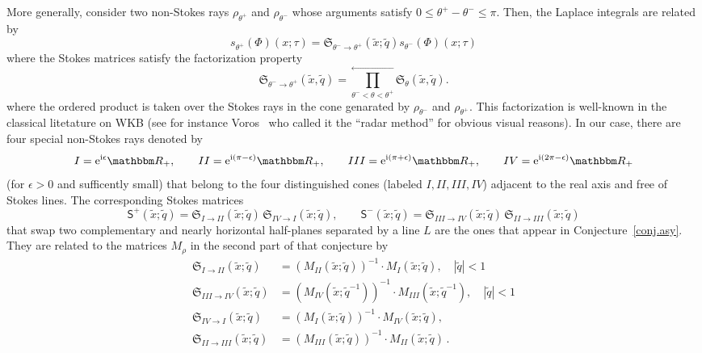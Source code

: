\documentclass[12pt,reqno]{amsart}
\theoremstyle{definition}
\def\BR{\mathbbm R}
\def\tq{\tilde{q}}
\def\tx{\tilde{x}}
\def\th{\theta}
\def\ri{\mathrm{i}}
\def\tx{\tilde{x}}
\def\re{{\rm e}}
\def\ri{{\rm i}}
\def\mf{\mathfrak}
\def\mfS{\mathfrak{S}}
\def\ms{\mathsf}
\newcommand{\nn}{\nonumber \\}
\begin{document}
More generally, consider two non-Stokes rays $\rho_{\th^+}$ and
$\rho_{\th^-}$ whose arguments satisfy $0 \leq \th^+-\th^- \leq
\pi$. Then, the Laplace integrals are related by
\begin{equation}
\label{lap3}
  s_{\theta^+}(\Phi)(x;\tau) =
  \mfS_{\theta^- \rightarrow \theta^+}(\tx;\tq) s_{\theta^-}(\Phi)(x;\tau) 
\end{equation}
where the Stokes matrices satisfy the factorization property
\begin{equation}
  \mfS_{\theta^- \rightarrow \theta^+ }(\tx,\tq) =
  \prod_{\th^- < \th < \th^+}^{\longleftarrow} \mfS_{\th}(\tx,\tq).
  \label{eq:SRR-fac}
\end{equation}
where the ordered product is taken over the Stokes rays in the cone
genarated by $\rho_{\th^-}$ and $\rho_{\th^+}$. This factorization is
well-known in the classical litetature on WKB (see for instance
Voros~\cite[p.228]{voros} who called it the ``radar method''  for
obvious visual reasons). In our case, there are four
special non-Stokes rays denoted by 
\begin{equation}
\label{4I}
I=\re^{\ri \epsilon}\BR_+,
\qquad II=\re^{\ri (\pi-\epsilon)}\BR_+,
\qquad III=\re^{\ri (\pi+\epsilon)}\BR_+,
\qquad IV=\re^{\ri (2\pi-\epsilon)}\BR_+
\end{equation}
(for $\epsilon>0$ and sufficently small) that belong to the four
distinguished cones (labeled $I,II,III,IV$) adjacent to the real axis
and free of Stokes lines. The corresponding Stokes matrices
\begin{equation}
  \label{SG}
  \ms{S}^+(\tx;\tq) =
  \mf{S}_{I\rightarrow II}(\tx;\tq)\, \mf{S}_{IV\rightarrow I}(\tx;\tq),
  \qquad
  \ms{S}^-(\tx;\tq) =
  \mf{S}_{III\rightarrow IV}(\tx;\tq)\, \mf{S}_{II\rightarrow III}(\tx;\tq)
\end{equation}
that swap two complementary and nearly horizontal half-planes
separated by a line $L$ are the ones that appear in
Conjecture~\ref{conj.asy}. They are related to the matrices
$M_\rho$ in the second part of that conjecture by
\begin{align}
  \mfS_{I\rightarrow II}(\tx;\tq)
  &= (M_{II}(\tx;\tq))^{-1}\cdot M_{I}(\tx;\tq),\quad |\tq|<1\nn
    \mfS_{III\rightarrow IV}(\tx;\tq)
  &= (M_{IV}(\tx;\tq^{-1}))^{-1}\cdot M_{III}(\tx;\tq^{-1}),\quad |\tq|<1\nn
    \mfS_{IV\rightarrow I}(\tx;\tq)
  &= (M_{I}(\tx;\tq))^{-1}\cdot M_{IV}(\tx;\tq),\nn
    \mfS_{II\rightarrow III}(\tx;\tq)
  &= (M_{III}(\tx;\tq))^{-1}\cdot M_{II}(\tx;\tq) \,.
    \label{4G}
\end{align}
\end{document}
